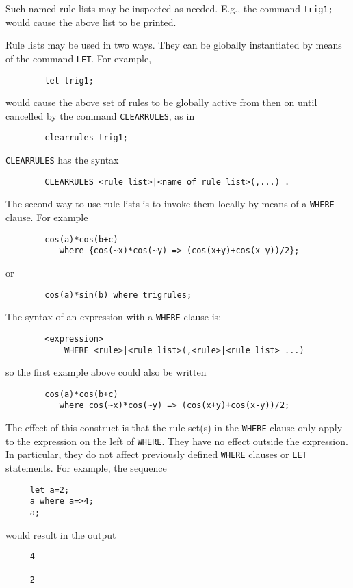 Such named rule lists may be inspected as needed. E.g., the command
{\tt trig1;} would cause the above list to be printed.

Rule lists may be used in two ways.  They can be globally instantiated by
means of the command {\tt LET}. For example,
\begin{verbatim}
        let trig1;
\end{verbatim}
would cause the above set of rules to be globally active from then on until
cancelled by the command {\tt CLEARRULES},  as in
\begin{verbatim}
        clearrules trig1;
\end{verbatim}
{\tt CLEARRULES} has the syntax
\begin{verbatim}
        CLEARRULES <rule list>|<name of rule list>(,...) .
\end{verbatim}

The second way to use rule lists is to invoke them locally by means of a
{\tt WHERE}  clause.  For example
\begin{verbatim}
        cos(a)*cos(b+c)
           where {cos(~x)*cos(~y) => (cos(x+y)+cos(x-y))/2};
\end{verbatim}
or
\begin{verbatim}
        cos(a)*sin(b) where trigrules;
\end{verbatim}

The syntax of an expression with a {\tt WHERE} clause is:
\begin{verbatim}
        <expression>
            WHERE <rule>|<rule list>(,<rule>|<rule list> ...)
\end{verbatim}
so the first example above could also be written
\begin{verbatim}
        cos(a)*cos(b+c)
           where cos(~x)*cos(~y) => (cos(x+y)+cos(x-y))/2;
\end{verbatim}

The effect of this construct is that the rule set(s) in the {\tt WHERE}
clause only apply to the expression on the left of {\tt WHERE}.  They have
no effect outside the expression.  In particular, they do not affect
previously defined {\tt WHERE} clauses or {\tt LET} statements.  For
example, the sequence
\begin{verbatim}
     let a=2;
     a where a=>4;
     a;
\end{verbatim}
would result in the output
\begin{verbatim}
     4

     2
\end{verbatim}

